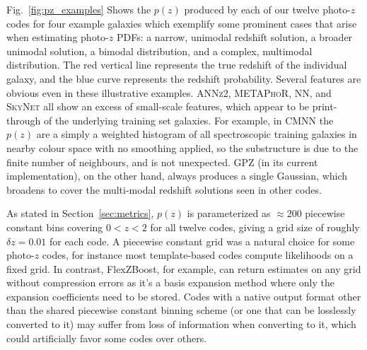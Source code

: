 Fig.~\ref{fig:pz_examples} Shows the $p(z)$ produced by each of our twelve photo-$z$ codes for four example galaxies which exemplify some prominent cases that arise when estimating photo-$z$ PDFs: a narrow, unimodal redshift solution, a broader unimodal solution, a bimodal distribution, and a complex, multimodal distribution.
The red vertical line represents the true redshift of the individual galaxy, and the blue curve represents the redshift probability.
Several features are obvious even in these illustrative examples.
\textsc{ANNz2, METAPhoR, NN,} and \textsc{SkyNet} all show an excess of small-scale features, which appear to be print-through of the underlying training set galaxies.  For example, in \textsc{CMNN} the $p(z)$ are a simply a weighted histogram of all spectroscopic training galaxies in nearby colour space with no smoothing applied, so the substructure is due to the finite number of neighbours, and is not unexpected.
\textsc{GPZ} (in its current implementation), on the other hand, always produces a single Gaussian, which broadens to cover the multi-modal redshift solutions seen in other codes.

As stated in Section~\ref{sec:metrics}, $p(z)$ is parameterized as $\approx 200$ piecewise constant bins covering $0<z<2$ for all twelve codes, giving a grid size of roughly $\delta z = 0.01$ for each code.
A piecewise constant grid was a natural choice for some photo-$z$ codes, for instance most template-based codes compute likelihoods on a fixed grid.
In contrast, FlexZBoost, for example, can return estimates on any grid without compression errors as it’s a basis expansion method where only the expansion coefficients need to be stored.
Codes with a native output format other than the shared piecewise constant binning scheme (or one that can be losslessly converted to it) may suffer from loss of information when converting to it, which could artificially favor some codes over others.

